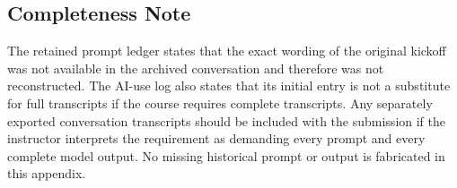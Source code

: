 \subsection{Completeness Note}
The retained prompt ledger states that the exact wording of the original kickoff was not available in the archived conversation and therefore was not reconstructed. The AI-use log also states that its initial entry is not a substitute for full transcripts if the course requires complete transcripts. Any separately exported conversation transcripts should be included with the submission if the instructor interprets the requirement as demanding every prompt and every complete model output. No missing historical prompt or output is fabricated in this appendix.
